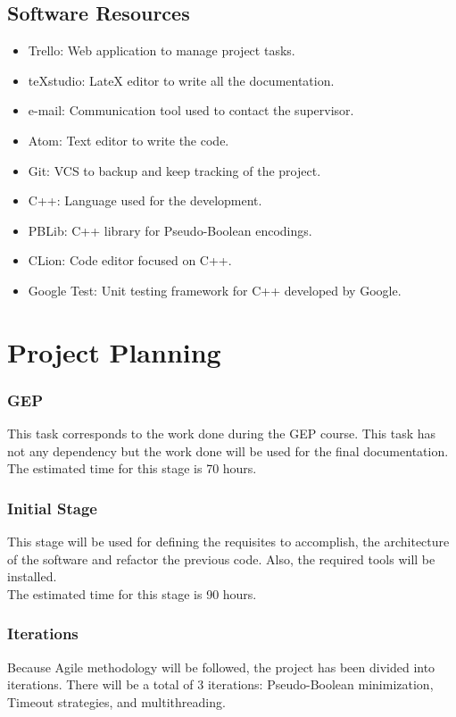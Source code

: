 \subsection{Software Resources}
\begin{itemize}
	\item Trello: Web application to manage project tasks.
	\item teXstudio: LateX editor to write all the documentation.
	\item e-mail: Communication tool used to contact the supervisor. 
	\item Atom: Text editor to write the code.
	\item Git: VCS to backup and keep tracking of the project.
	\item C++: Language used for the development.
	\item PBLib: C++ library for Pseudo-Boolean encodings.
	\item CLion: Code editor focused on C++.
	\item Google Test: Unit testing framework for C++ developed by Google.
\end{itemize}

\section{Project Planning}

\subsubsection{GEP}
This task corresponds to the work done during the GEP course. This task has not any dependency but the work done will be used for the final documentation.\\

The estimated time for this stage is 70 hours.
\subsubsection{Initial Stage}
This stage will be used for defining the requisites to accomplish, the architecture of the software and refactor the previous code. Also, the required tools will be installed. \\

The estimated time for this stage is 90 hours.
\subsubsection{Iterations}
Because Agile methodology will be followed, the project has been divided into iterations. There will be a total of 3 iterations: Pseudo-Boolean minimization, Timeout strategies, and multithreading.\\

